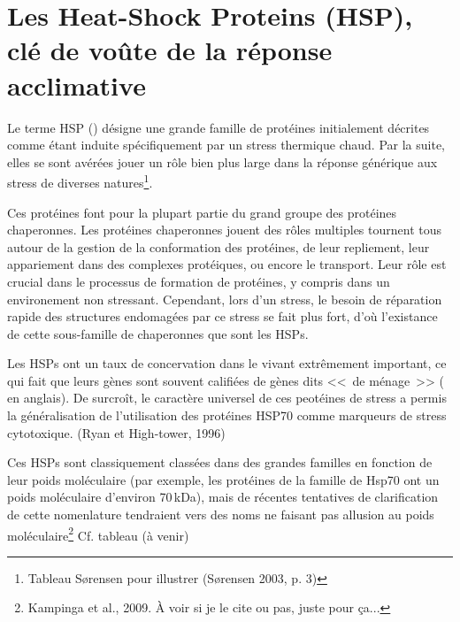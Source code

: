%			

		\section{Les Heat-Shock Proteins (HSP), clé de voûte de la réponse acclimative} %
		\label{sec:generalites_HSP}
%			

Le terme HSP () désigne une grande famille de
protéines initialement décrites comme étant induite spécifiquement par un
stress thermique chaud. Par la suite, elles se sont avérées jouer un rôle bien
plus large\cite{zhang2011} dans la réponse générique aux stress de diverses
natures\cite{sorensen2003}\footnote{Tableau Sørensen pour illustrer (Sørensen 2003, p. 3)}.


Ces protéines font pour la plupart partie du grand groupe des protéines chaperonnes\cite{federhoffmann1999}. Les
protéines chaperonnes jouent des rôles multiples tournent tous autour de la
gestion de la conformation des protéines, de leur repliement, leur appariement
dans des complexes protéiques, ou encore le transport.  Leur rôle est crucial
dans le processus de formation de protéines, y compris dans un environement
non stressant. Cependant, lors d'un stress, le besoin de réparation rapide des
structures endomagées par ce stress se fait plus fort, d'où l'existance de
cette sous-famille de chaperonnes que sont les HSPs.


Les HSPs ont un taux de concervation dans le vivant extrêmement important, ce
qui fait que leurs gènes sont souvent califiées de gènes dits <<~de ménage~>>
( en anglais). De surcroît, le caractère universel de ces peotéines de stress a permis la généralisation de l’utilisation des protéines HSP70 comme marqueurs de stress cytotoxique. (Ryan et High-tower, 1996) %


Ces HSPs sont classiquement classées dans des grandes familles en fonction de
leur poids moléculaire \cite{fink1999} (par exemple, les protéines de la
famille de Hsp70 ont un poids moléculaire d'environ 70\,kDa), mais de récentes
tentatives de clarification de cette nomenlature tendraient vers des noms ne
faisant pas allusion au poids moléculaire\footnote{Kampinga et al., 2009. À
voir si je le cite ou pas, juste pour ça...} Cf. tableau (à venir)

